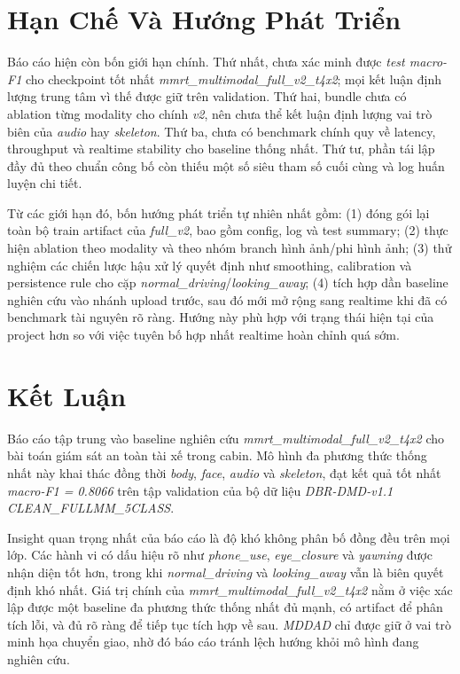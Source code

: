 \documentclass[conference,a4paper]{IEEEtran}
\begin{document}
\section[Han Che Va Huong Phat Trien]{Hạn Chế Và Hướng Phát Triển}
Báo cáo hiện còn bốn giới hạn chính. Thứ nhất, chưa xác minh được \textit{test macro-F1} cho checkpoint tốt nhất \textit{mmrt\_multimodal\_full\_v2\_t4x2}; mọi kết luận định lượng trung tâm vì thế được giữ trên validation. Thứ hai, bundle chưa có ablation từng modality cho chính \textit{v2}, nên chưa thể kết luận định lượng vai trò biên của \textit{audio} hay \textit{skeleton}. Thứ ba, chưa có benchmark chính quy về latency, throughput và realtime stability cho baseline thống nhất. Thứ tư, phần tái lập đầy đủ theo chuẩn công bố còn thiếu một số siêu tham số cuối cùng và log huấn luyện chi tiết.

Từ các giới hạn đó, bốn hướng phát triển tự nhiên nhất gồm: (1) đóng gói lại toàn bộ train artifact của \textit{full\_v2}, bao gồm config, log và test summary; (2) thực hiện ablation theo modality và theo nhóm branch hình ảnh/phi hình ảnh; (3) thử nghiệm các chiến lược hậu xử lý quyết định như smoothing, calibration và persistence rule cho cặp \textit{normal\_driving}/\textit{looking\_away}; (4) tích hợp dần baseline nghiên cứu vào nhánh upload trước, sau đó mới mở rộng sang realtime khi đã có benchmark tài nguyên rõ ràng. Hướng này phù hợp với trạng thái hiện tại của project hơn so với việc tuyên bố hợp nhất realtime hoàn chỉnh quá sớm.

\section[Ket Luan]{Kết Luận}
Báo cáo tập trung vào baseline nghiên cứu \textit{mmrt\_multimodal\_full\_v2\_t4x2} cho bài toán giám sát an toàn tài xế trong cabin. Mô hình đa phương thức thống nhất này khai thác đồng thời \textit{body}, \textit{face}, \textit{audio} và \textit{skeleton}, đạt kết quả tốt nhất \textit{macro-F1 = 0.8066} trên tập validation của bộ dữ liệu \textit{DBR-DMD-v1.1 CLEAN\_FULLMM\_5CLASS}. 

Insight quan trọng nhất của báo cáo là độ khó không phân bố đồng đều trên mọi lớp. Các hành vi có dấu hiệu rõ như \textit{phone\_use}, \textit{eye\_closure} và \textit{yawning} được nhận diện tốt hơn, trong khi \textit{normal\_driving} và \textit{looking\_away} vẫn là biên quyết định khó nhất. Giá trị chính của \textit{mmrt\_multimodal\_full\_v2\_t4x2} nằm ở việc xác lập được một baseline đa phương thức thống nhất đủ mạnh, có artifact để phân tích lỗi, và đủ rõ ràng để tiếp tục tích hợp về sau. \textit{MDDAD} chỉ được giữ ở vai trò minh họa chuyển giao, nhờ đó báo cáo tránh lệch hướng khỏi mô hình đang nghiên cứu.
\end{document}
